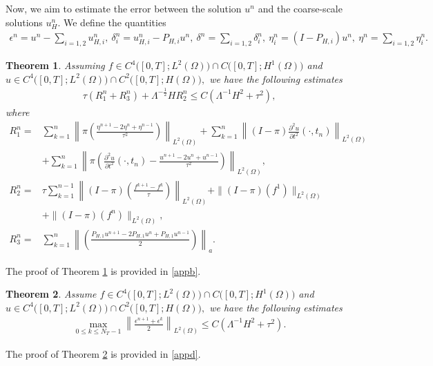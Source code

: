 \documentclass[preprint,12pt]{elsarticle}
\newtheorem{theorem}{Theorem}
\begin{document}
Now, we aim to estimate the error between the solution $u^{n}$ and the coarse-scale solutions $u_{H}^{n}$. We define the quantities
\begin{equation}\label{2.1}
\begin{aligned}
     \epsilon^{n} = u^{n}-\sum_{i=1,2} u_{H,i}^{n},~
     \delta^{n}_i = u_{H,i}^{n}-P_{H,i}u^{n},~\delta^{n}=\sum_{i=1,2}\delta^{n}_i,~
     \eta^{n}_i = (I-P_{H,i})u^{n},~\eta^{n}=\sum_{i=1,2}\eta^{n}_i.
\end{aligned}
\end{equation}

\begin{theorem}\label{2.01}
Assuming $f\in C^4\big([0,T];L^2(\Omega))\cap C([0,T];H^1(\Omega)\big)$ and $u\in C^4\big([0,T];L^2(\Omega))\cap C^2([0,T];H(\Omega)\big),$ we have the following estimates
\begin{equation}\label{2.2}
\begin{aligned}
     \tau (R_1^n+R_3^n)+\Lambda^{-\frac{1}{2}}HR_2^n\leq C(\Lambda^{-1}H^2+\tau^2),
\end{aligned}
\end{equation}
where 
\begin{equation}\label{2.03}
\begin{aligned}
     R_1^n=&\sum_{k=1}^n\left\|\pi\left(\frac{\eta^{n+1}-2\eta^n+\eta^{n-1}}{\tau^2}\right)\right\|_{L^2(\Omega)}+ \sum_{k=1}^n\left\| (I-\pi)\frac{\partial^2 u}{\partial t^2}(\cdot,t_n)\right\|_{L^2(\Omega)}\\
     &+\sum_{k=1}^n\left\|\pi\left(\frac{\partial^2u}{\partial t^2}(\cdot,t_n)-\frac{u^{n+1}-2u^n+u^{n-1}}{\tau^2}\right)\right\|_{L^2(\Omega)},\\
     R_2^n=&\tau\sum_{k=1}^{n-1}\left\|(I-\pi)(\frac{f^{k+1}-f^k}{\tau})\right\|_{L^2(\Omega)}+\|(I-\pi)(f^1)\|_{L^2(\Omega)}\\
     &+\|(I-\pi)(f^n)\|_{L^2(\Omega)},\\
     R_3^n=&\sum_{k=1}^n\left\|\left(\frac{P_{H,1}u^{n+1}-2P_{H,1}u^n+P_{H,1}u^{n-1}}{2}\right)\right\|_a.
\end{aligned}
\end{equation}
\end{theorem}
The proof of Theorem \ref{2.01} is provided in \ref{appb}.



\begin{theorem}\label{2.02}
Assume $f\in C^4\big([0,T];L^2(\Omega))\cap C([0,T];H^1(\Omega)\big)$ and $u\in C^4\big([0,T];L^2(\Omega))\cap C^2([0,T];H(\Omega)\big),$ we have the following estimates
\begin{equation}\label{2.4}
\begin{aligned}
     \max_{0\leq k\leq N_{T}-1}\left\|\frac{\epsilon^{n+1}+\epsilon^k}{2}\right\|_{L^2(\Omega)}\leq C(\Lambda^{-1}H^2+\tau^2).
\end{aligned}
\end{equation}
\end{theorem}
The proof of Theorem \ref{2.02} is provided in \ref{appd}.
\end{document}
